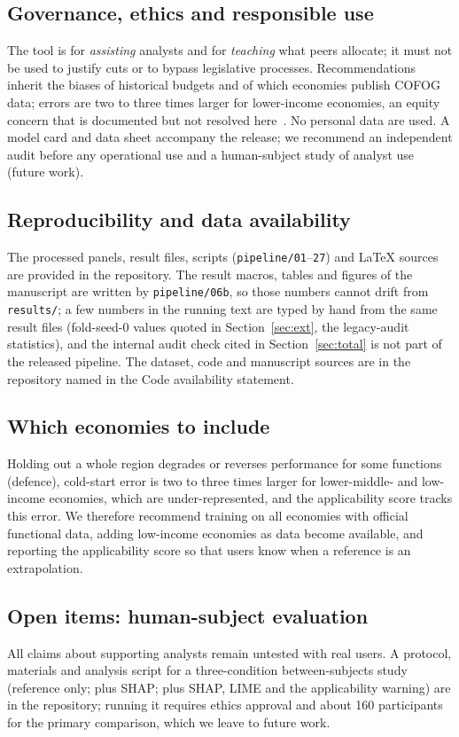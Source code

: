 \subsection{Governance, ethics and responsible use}
The tool is for \emph{assisting} analysts and for \emph{teaching} what peers allocate; it must not be used to justify cuts or to bypass legislative processes. Recommendations inherit the biases of historical budgets and of which economies publish COFOG data; errors are two to three times larger for lower-income economies, an equity concern that is documented but not resolved here~\cite{mehrabi2021,obermeyer2019}. No personal data are used. A model card and data sheet accompany the release; we recommend an independent audit before any operational use and a human-subject study of analyst use (future work).

\subsection{Reproducibility and data availability}
The processed panels, result files, scripts (\texttt{pipeline/01}--\texttt{27}) and LaTeX sources are provided in the repository. The result macros, tables and figures of the manuscript are written by \texttt{pipeline/06b}, so those numbers cannot drift from \texttt{results/}; a few numbers in the running text are typed by hand from the same result files (fold-seed-0 values quoted in Section~\ref{sec:ext}, the legacy-audit statistics), and the internal audit check cited in Section~\ref{sec:total} is not part of the released pipeline. The dataset, code and manuscript sources are in the repository named in the Code availability statement.

\subsection{Which economies to include}
Holding out a whole region degrades or reverses performance for some functions (defence), cold-start error is two to three times larger for lower-middle- and low-income economies, which are under-represented, and the applicability score tracks this error. We therefore recommend training on all economies with official functional data, adding low-income economies as data become available, and reporting the applicability score so that users know when a reference is an extrapolation.

\subsection{Open items: human-subject evaluation}\label{sec:open}
All claims about supporting analysts remain untested with real users. A protocol, materials and analysis script for a three-condition between-subjects study (reference only; plus SHAP; plus SHAP, LIME and the applicability warning) are in the repository; running it requires ethics approval and about 160 participants for the primary comparison, which we leave to future work.
